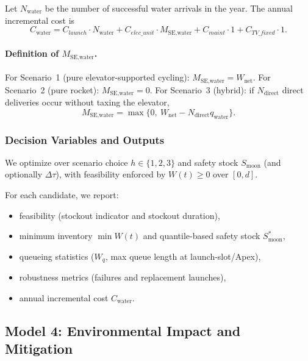 ﻿\documentclass{mcmthesis}
\begin{document}
Let $N_{\text{water}}$ be the number of successful water arrivals in the year.
The annual incremental cost is
\begin{equation}
C_{\text{water}} =
C_{launch}\cdot N_{\text{water}}
+ C_{elec\_unit}\cdot M_{\text{SE,water}}
+ C_{maint}\cdot 1
+ C_{TV\_fixed}\cdot 1.
\end{equation}

\paragraph{Definition of $M_{\text{SE,water}}$.}
For Scenario~1 (pure elevator-supported cycling): $M_{\text{SE,water}}=W_{\text{net}}$.
For Scenario~2 (pure rocket): $M_{\text{SE,water}}=0$.
For Scenario~3 (hybrid): if $N_{\text{direct}}$ direct deliveries occur without taxing the elevator,
\[
M_{\text{SE,water}}=\max\{0,\ W_{\text{net}}-N_{\text{direct}}q_{\text{water}}\}.
\]

\subsubsection{Decision Variables and Outputs}
\label{sec:model3_output_opt}

We optimize over scenario choice $h\in\{1,2,3\}$ and safety stock $S_{\text{moon}}$ (and optionally $\Delta\tau$),
with feasibility enforced by $W(t)\ge 0$ over $[0,d]$.

For each candidate, we report:
\begin{itemize}
\item feasibility (stockout indicator and stockout duration),
\item minimum inventory $\min W(t)$ and quantile-based safety stock $S_{\text{moon}}^*$,
\item queueing statistics ($W_q$, max queue length at launch-slot/Apex),
\item robustness metrics (failures and replacement launches),
\item annual incremental cost $C_{\text{water}}$.
\end{itemize}

\subsection{Model 4: Environmental Impact and Mitigation}
\label{sec:task4_env}
\end{document}
